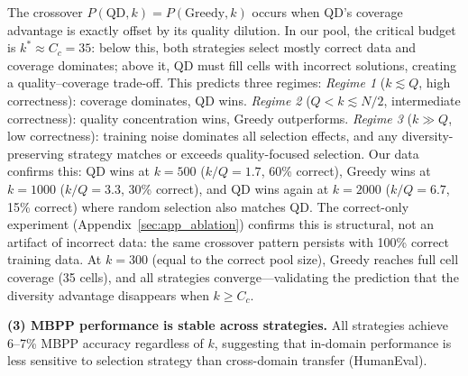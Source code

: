 \documentclass{article}
\begin{document}
\begin{enumerate}[nosep]
The crossover $P(\text{QD}, k) = P(\text{Greedy}, k)$ occurs when QD's coverage advantage is exactly offset by its quality dilution.
In our pool, the critical budget is $k^* \approx C_c = 35$: below this, both strategies select mostly correct data and coverage dominates; above it, QD must fill cells with incorrect solutions, creating a quality--coverage trade-off.
This predicts three regimes:
\emph{Regime 1} ($k \lesssim Q$, high correctness): coverage dominates, QD wins.
\emph{Regime 2} ($Q < k \lesssim N/2$, intermediate correctness): quality concentration wins, Greedy outperforms.
\emph{Regime 3} ($k \gg Q$, low correctness): training noise dominates all selection effects, and any diversity-preserving strategy matches or exceeds quality-focused selection.
Our data confirms this: QD wins at $k{=}500$ ($k/Q = 1.7$, 60\% correct), Greedy wins at $k{=}1000$ ($k/Q = 3.3$, 30\% correct), and QD wins again at $k{=}2000$ ($k/Q = 6.7$, 15\% correct) where random selection also matches QD.
The correct-only experiment (Appendix~\ref{sec:app_ablation}) confirms this is structural, not an artifact of incorrect data: the same crossover pattern persists with 100\% correct training data.
At $k{=}300$ (equal to the correct pool size), Greedy reaches full cell coverage (35 cells), and all strategies converge---validating the prediction that the diversity advantage disappears when $k \geq C_c$.

\textbf{(3) MBPP performance is stable across strategies.}
All strategies achieve 6--7\% MBPP accuracy regardless of $k$, suggesting that in-domain performance is less sensitive to selection strategy than cross-domain transfer (HumanEval).


\end{enumerate}
\end{document}
